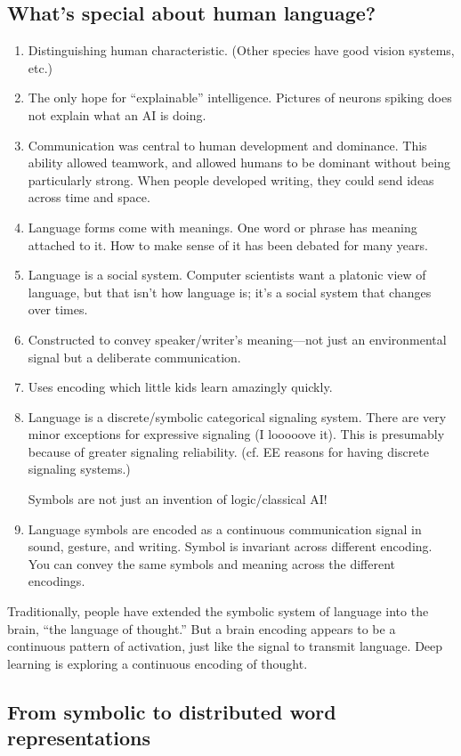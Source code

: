 \subsection{What's special about human language?}
\begin{enumerate}
\item
Distinguishing human characteristic. (Other species have good vision systems, etc.)
\item
The only hope for ``explainable'' intelligence.
Pictures of neurons spiking does not explain what an AI is doing.
\item
Communication was central to human development and dominance. 
This ability allowed teamwork, and allowed humans to be dominant without being particularly strong.
When people developed writing, they could send ideas across time and space.
\item
Language forms come with meanings. One word or phrase has meaning attached to it. How to make sense of it has been debated for many years.
\item
Language is a social system. Computer scientists want a platonic view of language, but that isn't how language is; it's a social system that changes over times.
\item
Constructed to convey speaker/writer's meaning---not just an environmental signal but a deliberate communication.
\item
Uses encoding which little kids learn amazingly quickly.
\item
Language is a discrete/symbolic categorical signaling system. There are very minor exceptions for expressive signaling (I looooove it). This is presumably because of greater signaling reliability.
(cf. EE reasons for having discrete signaling systems.)

Symbols are not just an invention of logic/classical AI!
\item
Language symbols are encoded as a continuous communication signal in sound, gesture, and writing. 
Symbol is invariant across different encoding. You can convey the same symbols and meaning across the different encodings.
\end{enumerate}

Traditionally, people have extended the symbolic system of language into the brain, ``the language of thought.''
But a brain encoding appears to be a continuous pattern of activation, just like the signal to transmit language.
Deep learning is exploring a continuous encoding of thought.
\subsection{From symbolic to distributed word representations}

